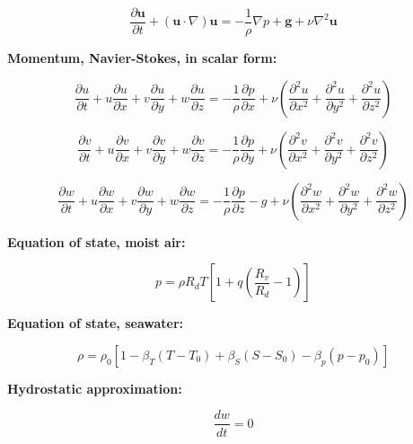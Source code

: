 \documentclass[12pt]{article}
\numberwithin{equation}{section}
\numberwithin{figure}{section}
\numberwithin{table}{section}
\begin{document}
\begin{equation}
  \frac{\partial \mathbf{u}}{\partial t} + (\mathbf{u} \cdot \nabla) \mathbf{u} =
  - \frac{1}{\rho} \nabla p + \mathbf{g} + \nu \nabla^2 \mathbf{u}
\end{equation}

\textbf{Momentum, Navier-Stokes, in scalar form:}

\begin{equation}
  \frac{\partial u}{\partial t} + 
  u \frac{\partial u}{\partial x} + 
  v \frac{\partial u}{\partial y} + 
  w \frac{\partial u}{\partial z} = 
  - \frac{1}{\rho} \frac{\partial p}{\partial x} + \nu \left( \frac{\partial^2 u}{\partial x^2} + \frac{\partial^2 u}{\partial y^2} + \frac{\partial^2 u}{\partial z^2} \right)
\end{equation}

\begin{equation}
  \frac{\partial v}{\partial t} + 
  u \frac{\partial v}{\partial x} + 
  v \frac{\partial v}{\partial y} + 
  w \frac{\partial v}{\partial z} = 
  - \frac{1}{\rho} \frac{\partial p}{\partial y} + \nu \left( \frac{\partial^2 v}{\partial x^2} + \frac{\partial^2 v}{\partial y^2} + \frac{\partial^2 v}{\partial z^2} \right)
\end{equation}

\begin{equation}
  \frac{\partial w}{\partial t} + 
  u \frac{\partial w}{\partial x} + 
  v \frac{\partial w}{\partial y} + 
  w \frac{\partial w}{\partial z} = 
  - \frac{1}{\rho} \frac{\partial p}{\partial z} - g + \nu \left( \frac{\partial^2 w}{\partial x^2} + \frac{\partial^2 w}{\partial y^2} + \frac{\partial^2 w}{\partial z^2} \right)
\end{equation}

\textbf{Equation of state, moist air:}

\begin{equation}
  p = \rho R_d T \left[1 + q \left(\frac{R_v}{R_d} - 1 \right) \right]
\end{equation}

\textbf{Equation of state, seawater:}

\begin{equation}
  \rho = \rho_0 \left[ 1 - \beta_T(T-T_0) + \beta_S(S-S_0) - \beta_p(p-p_0) \right]
\end{equation}

\textbf{Hydrostatic approximation:}

\begin{equation}
  \frac{dw}{dt} = 0
\end{equation}
\end{document}
